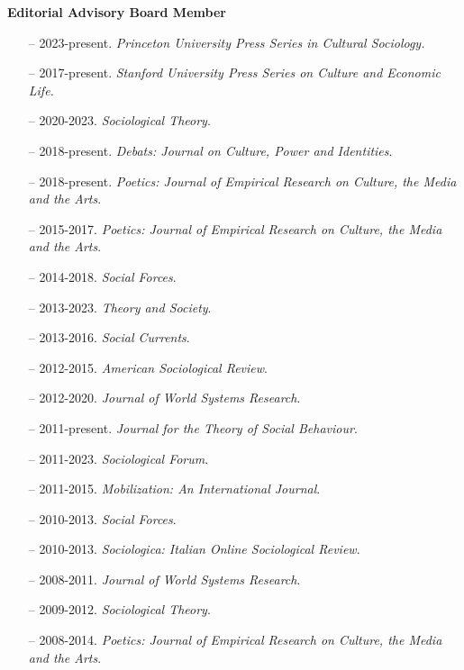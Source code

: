 \medskip
\noindent\textbf{Editorial Advisory Board Member} 

\begin{itemize}[itemsep=-0.5ex]
    \item[--] 2023-present. {\em Princeton University Press Series in Cultural Sociology.}
    \item[--] 2017-present. {\em Stanford University Press Series on Culture and Economic Life.}
    \item[--] 2020-2023. {\em Sociological Theory}.
	\item[--] 2018-present. {\em Debats: Journal on Culture, Power and Identities}. 
    \item[--] 2018-present. {\em Poetics: Journal of Empirical Research on Culture, the Media and the Arts}.
    \item[--] 2015-2017. {\em Poetics: Journal of Empirical Research on Culture, the Media and the Arts}.
    \item[--] 2014-2018. {\em Social Forces}.
    \item[--] 2013-2023.  {\em Theory and Society}.
    \item[--] 2013-2016. {\em Social Currents}.
    \item[--] 2012-2015. {\em American Sociological Review}. 
    \item[--] 2012-2020. {\em Journal of World Systems Research}.
    \item[--] 2011-present. {\em Journal for the Theory of Social Behaviour}.
    \item[--] 2011-2023. {\em Sociological Forum}.
    \item[--] 2011-2015. {\em Mobilization: An International Journal}.
    \item[--] 2010-2013. {\em Social Forces}.
    \item[--] 2010-2013. {\em Sociologica: Italian Online Sociological Review}.
    \item[--] 2008-2011. {\em Journal of World Systems Research}.
    \item[--] 2009-2012. {\em Sociological Theory}.
    \item[--] 2008-2014. {\em Poetics: Journal of Empirical Research on Culture, the Media and the Arts}.
\end{itemize}